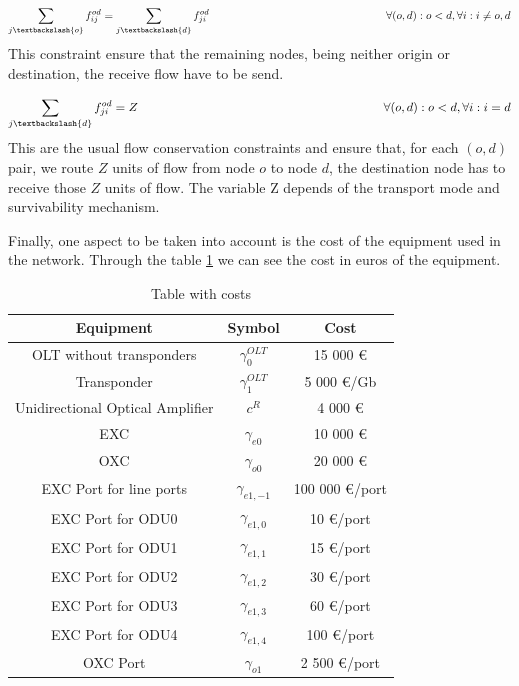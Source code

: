 \begin{equation}
\sum_{j\textbackslash \{o\}} f_{ij}^{od} = \sum_{j\textbackslash \{d\}} f_{ji}^{od}   \qquad \qquad \qquad \qquad \qquad \qquad \qquad \qquad
\forall(o,d) : o < d, \forall i: i \neq o,d
\label{ILPOpaque2_CAPEX}
\end{equation}
\noindent
This constraint ensure that the remaining nodes, being neither origin or destination, the receive flow have to be send.

\begin{equation}
\sum_{j\textbackslash \{d\}} f_{ji}^{od} = Z  \qquad \qquad \qquad \qquad \qquad \qquad \qquad \qquad \qquad \qquad
\forall(o,d) : o < d, \forall i: i = d
\label{ILPOpaque3_CAPEX}
\end{equation}
\noindent
This are the usual flow conservation constraints and ensure that, for each $(o,d)$ pair, we route $Z$ units of flow from node $o$ to node $d$, the destination node has to receive those $Z$ units of flow. The variable Z depends of the transport mode and survivability mechanism.\\

\vspace{13pt}

Finally, one aspect to be taken into account is the cost of the equipment used in the network. Through the table \ref{table_cost_ilp} we can see the cost in euros of the equipment.\\

\begin{table}[h!]
\centering
\begin{tabular}{|| c | c | c||}
 \hline
 Equipment & Symbol & Cost \\
 \hline\hline
 OLT without transponders & $\gamma_0^{OLT}$ & 15 000 \euro \\
 Transponder & $\gamma_1^{OLT}$ & 5 000 \euro/Gb \\
 Unidirectional Optical Amplifier & $c^R$ & 4 000 \euro \\
 EXC & $\gamma_{e0}$ & 10 000 \euro \\
 OXC & $\gamma_{o0}$ & 20 000 \euro \\
 EXC Port for line ports & $\gamma_{e1,-1}$ & 100 000 \euro /port\\
 EXC Port for ODU0 & $\gamma_{e1,0}$ & 10 \euro /port\\
 EXC Port for ODU1 & $\gamma_{e1,1}$ & 15 \euro /port\\
 EXC Port for ODU2 & $\gamma_{e1,2}$ & 30 \euro /port\\
 EXC Port for ODU3 & $\gamma_{e1,3}$ & 60 \euro /port\\
 EXC Port for ODU4 & $\gamma_{e1,4}$ & 100 \euro /port\\
 OXC Port & $\gamma_{o1}$ & 2 500 \euro /port \\
 \hline
\end{tabular}
\caption{Table with costs}
\label{table_cost_ilp}
\end{table}

